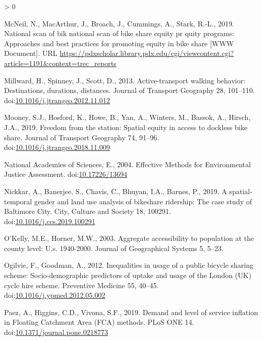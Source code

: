 \documentclass[]{elsarticle} %
\newlength{\cslhangindent}
\newenvironment{CSLReferences}[2] %
 {%
  \setlength{\parindent}{0pt}
  \ifodd #1 \everypar{\setlength{\hangindent}{\cslhangindent}}\ignorespaces\fi
  \ifnum #2 > 0
  \setlength{\parskip}{#2\baselineskip}
  \fi
 }%
 {}
\begin{document}
\begin{CSLReferences}{1}{0}
\leavevmode\hypertarget{ref-trec2019}{}%
McNeil, N., MacArthur, J., Broach, J., Cummings, A., Stark, R.-L., 2019.
National scan of bik national scan of bike share equity pr quity
programs: Approaches and best practices for promoting equity in bike
share {[}WWW Document{]}. URL
\url{https://pdxscholar.library.pdx.edu/cgi/viewcontent.cgi?article=1191\&context=trec_reports}

\leavevmode\hypertarget{ref-millwardActivetransportWalkingBehavior2013}{}%
Millward, H., Spinney, J., Scott, D., 2013. Active-transport walking
behavior: Destinations, durations, distances. Journal of Transport
Geography 28, 101--110.
doi:\href{https://doi.org/10.1016/j.jtrangeo.2012.11.012}{10.1016/j.jtrangeo.2012.11.012}

\leavevmode\hypertarget{ref-mooneyFreedomStationSpatial2019}{}%
Mooney, S.J., Hosford, K., Howe, B., Yan, A., Winters, M., Bassok, A.,
Hirsch, J.A., 2019. Freedom from the station: {Spatial} equity in access
to dockless bike share. Journal of Transport Geography 74, 91--96.
doi:\href{https://doi.org/10.1016/j.jtrangeo.2018.11.009}{10.1016/j.jtrangeo.2018.11.009}

\leavevmode\hypertarget{ref-nationalacademiesofsciencesEffectiveMethodsEnvironmental2004}{}%
National Academies of Sciences, E., 2004. Effective {Methods} for
{Environmental Justice Assessment}.
doi:\href{https://doi.org/10.17226/13694}{10.17226/13694}

\leavevmode\hypertarget{ref-nickkarSpatialtemporalGenderLand2019}{}%
Nickkar, A., Banerjee, S., Chavis, C., Bhuyan, I.A., Barnes, P., 2019. A
spatial-temporal gender and land use analysis of bikeshare ridership:
{The} case study of {Baltimore City}. City, Culture and Society 18,
100291.
doi:\href{https://doi.org/10.1016/j.ccs.2019.100291}{10.1016/j.ccs.2019.100291}

\leavevmode\hypertarget{ref-okelly2003aggregate}{}%
O'Kelly, M.E., Horner, M.W., 2003. Aggregate accessibility to population
at the county level: U.s. 1940-2000. Journal of Geographical Systems 5,
5--23.

\leavevmode\hypertarget{ref-ogilvieInequalitiesUsagePublic2012}{}%
Ogilvie, F., Goodman, A., 2012. Inequalities in usage of a public
bicycle sharing scheme: {Socio}-demographic predictors of uptake and
usage of the {London} ({UK}) cycle hire scheme. Preventive Medicine 55,
40--45.
doi:\href{https://doi.org/10.1016/j.ypmed.2012.05.002}{10.1016/j.ypmed.2012.05.002}

\leavevmode\hypertarget{ref-paezDemandLevelService2019}{}%
Paez, A., Higgins, C.D., Vivona, S.F., 2019. Demand and level of service
inflation in {Floating Catchment Area} ({FCA}) methods. PLoS ONE 14.
doi:\href{https://doi.org/10.1371/journal.pone.0218773}{10.1371/journal.pone.0218773}


\end{CSLReferences}
\end{document}
